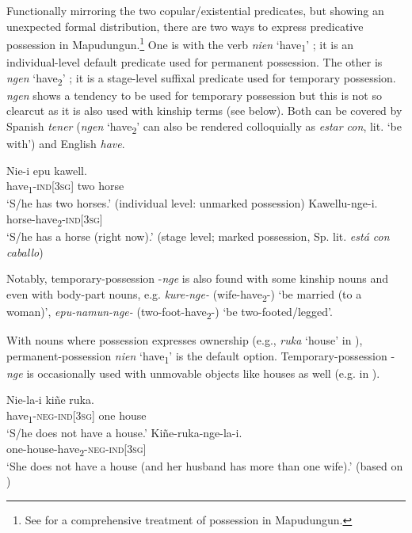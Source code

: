 \documentclass[output=paper,colorlinks,citecolor=brown,draft]{langscibook}
\begin{document}
Functionally mirroring the two copular/existential predicates, but showing an unexpected formal distribution, there are two ways to express predicative possession in Mapudungun.\footnote{See \citet{OlateEtAl2018} for a comprehensive treatment of possession in Mapudungun.} One is with the verb \textit{nien} ‘have\textsubscript{1}’ ; it is an individual-level default predicate used for permanent possession. The other is \textit{ngen} ‘have\textsubscript{2}’ ; it is a stage-level suffixal predicate used for temporary possession. 
\textit{ngen} shows a tendency to be used for temporary possession but this is not so clearcut as it is also used with kinship terms (see below).
Both can be covered by Spanish \textit{tener} (\textit{ngen} ‘have\textsubscript{2}’ can also be rendered colloquially as \textit{estar con}, lit. ‘be with’) and English \textit{have}.

\ea\label{ex:mapu:13}
    \ea\label{ex:mapu:13a}
        \gll Nie-i epu kawell. \\ 
             have\textsubscript{1}{}-\textsc{ind[3sg]} two horse \\
        \glt ‘S/he has two horses.’ (individual level: unmarked possession)
    \ex\label{ex:mapu:13b}
        \gll Kawellu-nge-i. \\
             horse-have\textsubscript{2}{}-\textsc{ind[3sg]} \\
        \glt ‘S/he has a horse (right now).’ (stage level; marked possession, Sp. lit. \textit{está con caballo})
    \z
\z 

Notably, temporary-possession -\textit{nge} is also found with some kinship nouns and even with body-part nouns, e.g. \textit{kure-nge-} (wife-have\textsubscript{2}{}-) ‘be married (to a woman)’, \textit{epu-namun{}-nge-} (two-foot-have\textsubscript{2}{}-) ‘be two-footed/legged’.

With nouns where possession expresses ownership (e.g., \textit{ruka} ‘house’ in ), permanent-possession \textit{nien} ‘have\textsubscript{1}’ is the default option. Temporary-possession -\textit{nge} is occasionally used with unmovable objects like houses as well (e.g. in ).

\ea\label{ex:mapu:14}
    \ea\label{ex:mapu:14a}
        \gll Nie-la-i kiñe ruka. \\ 
             have\textsubscript{1}{}-\textsc{neg}{}-\textsc{ind[3sg]} one house \\
        \glt ‘S/he does not have a house.’
    \ex\label{ex:mapu:14b}
        \gll Kiñe-ruka-nge-la-i. \\
             one-house-have\textsubscript{2}{}-\textsc{neg-ind[3sg]} \\
        \glt ‘She does not have a house (and her husband has more than one wife).’ (based on \citealt[9]{Augusta1903})
    \z
\z 
\end{document}
